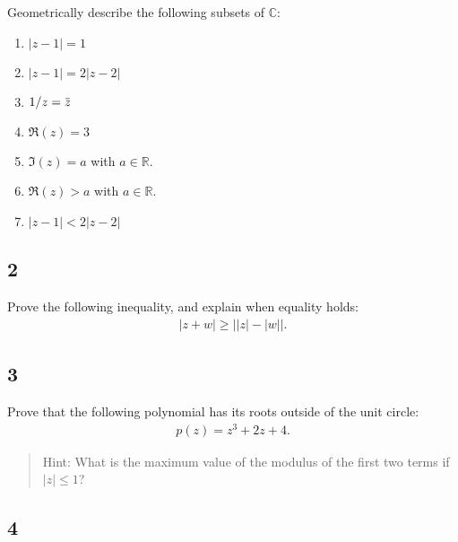 Geometrically describe the following subsets of \({\mathbb{C}}\):

\begin{enumerate}
\def\labelenumi{\alph{enumi}.}
\tightlist
\item
  \({\left\lvert {z-1} \right\rvert} = 1\)
\item
  \({\left\lvert {z-1} \right\rvert} = 2{\left\lvert {z-2} \right\rvert}\)
\item
  \(1/z = \mkern 1.5mu\overline{\mkern-1.5muz\mkern-1.5mu}\mkern 1.5mu\)
\item
  \(\Re(z) = 3\)
\item
  \(\Im(z) = a\) with \(a\in {\mathbb{R}}\).
\item
  \(\Re(z) > a\) with \(a\in {\mathbb{R}}\).
\item
  \({\left\lvert {z-1} \right\rvert} < 2{\left\lvert {z-2} \right\rvert}\)
\end{enumerate}

\hypertarget{section-22}{%
\subsection{2}\label{section-22}}

Prove the following inequality, and explain when equality holds:
\begin{align*}
{\left\lvert {z+w} \right\rvert} \geq {\left\lvert { {\left\lvert {z} \right\rvert} - {\left\lvert {w} \right\rvert} } \right\rvert}
.\end{align*}

\hypertarget{section-23}{%
\subsection{3}\label{section-23}}

Prove that the following polynomial has its roots outside of the unit
circle:
\begin{align*}
p(z) = z^3 + 2z + 4
.\end{align*}

\begin{quote}
Hint: What is the maximum value of the modulus of the first two terms if
\({\left\lvert {z} \right\rvert} \leq 1\)?
\end{quote}

\hypertarget{section-24}{%
\subsection{4}\label{section-24}}

